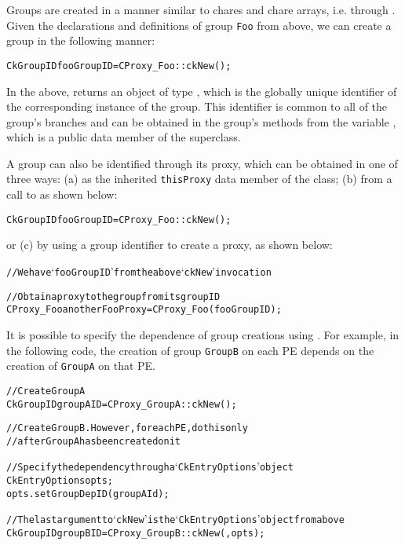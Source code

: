 Groups are created in a manner similar to chares and chare arrays, i.e. 
through . Given the declarations and definitions of group {\tt Foo}
from above, we can create a group in the following manner:

\begin{alltt}
CkGroupID fooGroupID = CProxy_Foo::ckNew();
\end{alltt}


In the above,  returns an object of type , which is
the globally unique identifier of the corresponding instance of the group.
This identifier is common to all of the group's branches and
can be obtained in the group's methods from the variable , which is a public data
member of the  superclass.

A group can also be identified through its proxy, which can be obtained in one of three ways:
(a) as the inherited {\tt thisProxy} data member of the class; (b) from a call to  
as shown below:

\begin{alltt}
CkGroupID fooGroupID = CProxy_Foo::ckNew();
\end{alltt}

or (c) by using a group identifier to create a proxy, as shown below:

\begin{alltt}
  // We have `fooGroupID' from the above `ckNew' invocation

  // Obtain a proxy to the group from its group ID
  CProxy_Foo anotherFooProxy = CProxy_Foo(fooGroupID);
\end{alltt}

It is possible to specify the dependence of group creations using
. For example, in the following code, the creation of group
{\tt GroupB} on each PE depends on the creation of {\tt GroupA} on that PE.

\begin{alltt}
// Create GroupA
CkGroupID groupAID = CProxy_GroupA::ckNew();

// Create GroupB. However, for each PE, do this only 
// after GroupA has been created on it

// Specify the dependency through a `CkEntryOptions' object
CkEntryOptions opts;
opts.setGroupDepID(groupAId);

// The last argument to `ckNew' is the `CkEntryOptions' object from above
CkGroupID groupBID = CProxy_GroupB::ckNew(, opts);
\end{alltt}

